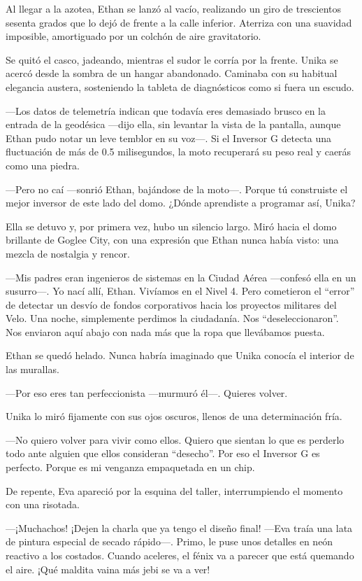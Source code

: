 \documentclass[11pt,twoside]{book}
\begin{document}
Al llegar a la azotea, Ethan se lanzó al vacío, realizando un giro de trescientos sesenta grados que lo dejó de frente a la calle inferior. Aterriza con una suavidad imposible, amortiguado por un colchón de aire gravitatorio.

Se quitó el casco, jadeando, mientras el sudor le corría por la frente. Unika se acercó desde la sombra de un hangar abandonado. Caminaba con su habitual elegancia austera, sosteniendo la tableta de diagnósticos como si fuera un escudo.

---Los datos de telemetría indican que todavía eres demasiado brusco en la entrada de la geodésica ---dijo ella, sin levantar la vista de la pantalla, aunque Ethan pudo notar un leve temblor en su voz---. Si el Inversor G detecta una fluctuación de más de 0.5 milisegundos, la moto recuperará su peso real y caerás como una piedra.

---Pero no caí ---sonrió Ethan, bajándose de la moto---. Porque tú construiste el mejor inversor de este lado del domo. ¿Dónde aprendiste a programar así, Unika?

Ella se detuvo y, por primera vez, hubo un silencio largo. Miró hacia el domo brillante de Goglee City, con una expresión que Ethan nunca había visto: una mezcla de nostalgia y rencor.

---Mis padres eran ingenieros de sistemas en la Ciudad Aérea ---confesó ella en un susurro---. Yo nací allí, Ethan. Vivíamos en el Nivel 4. Pero cometieron el ``error'' de detectar un desvío de fondos corporativos hacia los proyectos militares del Velo. Una noche, simplemente perdimos la ciudadanía. Nos ``deseleccionaron''. Nos enviaron aquí abajo con nada más que la ropa que llevábamos puesta.

Ethan se quedó helado. Nunca habría imaginado que Unika conocía el interior de las murallas.

---Por eso eres tan perfeccionista ---murmuró él---. Quieres volver.

Unika lo miró fijamente con sus ojos oscuros, llenos de una determinación fría.

---No quiero volver para vivir como ellos. Quiero que sientan lo que es perderlo todo ante alguien que ellos consideran ``desecho''. Por eso el Inversor G es perfecto. Porque es mi venganza empaquetada en un chip.

De repente, Eva apareció por la esquina del taller, interrumpiendo el momento con una risotada.

---¡Muchachos! ¡Dejen la charla que ya tengo el diseño final! ---Eva traía una lata de pintura especial de secado rápido---. Primo, le puse unos detalles en neón reactivo a los costados. Cuando aceleres, el fénix va a parecer que está quemando el aire. ¡Qué maldita vaina más jebi se va a ver!
\end{document}
